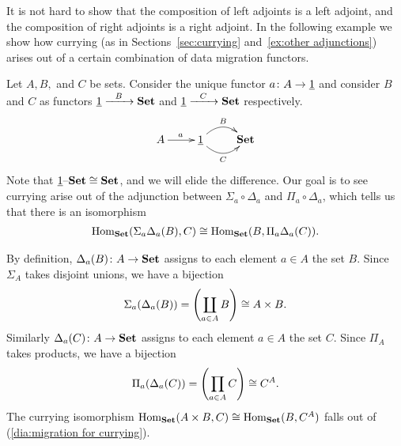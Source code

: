 \documentclass[CT4S-EN-RU]{subfiles}
\begin{document}
\begin{exampleRUS}
\end{exampleRUS}

\begin{blockENG}
It is not hard to show that the composition of left adjoints is a left adjoint, and the composition of right adjoints is a right adjoint. In the following example we show how currying (as in Sections~\ref{sec:currying} and~\ref{ex:other adjunctions}) arises out of a certain combination of data migration functors. 
\end{blockENG}

\begin{blockRUS}
\end{blockRUS}

\begin{exampleENG}
Let $A,B,$ and $C$ be sets. Consider the unique functor $a\colon A\rightarrow\underline{1}$ and consider $B$ and $C$ as functors $\underline{1}\xrightarrow{\ \ B\ \ }{\mathbf{Set}}$ and $\underline{1}\xrightarrow{\ \ C\ \ }{\mathbf{Set}}$ respectively. 
$$\xymatrix{A\ar[r]^a&\ul{1}\ar@/^1pc/[r]^B\ar@/_1pc/[r]_C&\Set}$$
Note that $\underline{1}{\text \textendash}{\mathbf{Set}}\cong{\mathbf{Set}}$, and we will elide the difference. Our goal is to see currying arise out of the adjunction between $\Sigma_a\circ\Delta_a$ and $\Pi_a\circ\Delta_a$, which tells us that there is an isomorphism
\begin{align}\label{dia:migration for currying}
\textnormal{Hom}_{\mathbf{Set}}(\Sigma_a\Delta_a(B),C)\cong\textnormal{Hom}_{\mathbf{Set}}(B,\Pi_a\Delta_a(C)).
\end{align}

By definition, $\Delta_a(B)\colon A\rightarrow{\mathbf{Set}}$ assigns to each element $a\in A$ the set $B$. Since $\Sigma_A$ takes disjoint unions, we have a bijection
$$\Sigma_a(\Delta_a(B))=\left(\coprod_{a\in A}B\right)\cong A\times B.$$ 
Similarly $\Delta_a(C)\colon A\rightarrow{\mathbf{Set}}$ assigns to each element $a\in A$ the set $C$. Since $\Pi_A$ takes products, we have a bijection
$$\Pi_a(\Delta_a(C))=\left(\prod_{a\in A}C\right)\cong C^A.$$
The currying isomorphism $\textnormal{Hom}_{\mathbf{Set}}(A\times B,C)\cong\textnormal{Hom}_{\mathbf{Set}}(B,C^A)$ falls out of (\ref{dia:migration for currying}).
\end{exampleENG}

\begin{exampleRUS}
\end{exampleRUS}


\subsection{}
\end{document}
